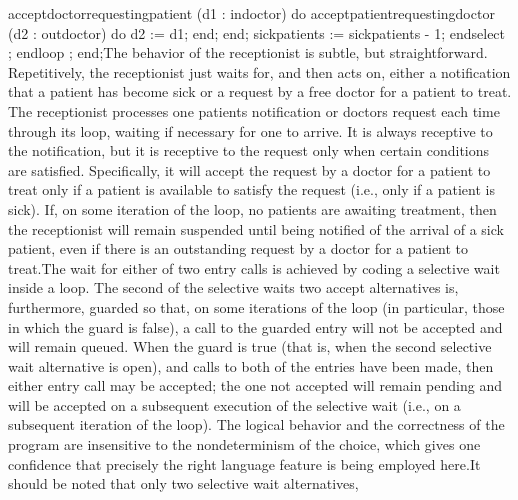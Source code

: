          \tyxtstxbf[]accept\tyxtstxendbf[] doctor\Symuns[]requesting\Symuns[]patient (d1 : %
\tyxtstxbf[]in\tyxtstxendbf[] doctor) \tyxtstxbf[]do%
\tyxtstxendbf[]
            \tyxtstxbf[]accept\tyxtstxendbf[] patient\Symuns[]requesting\Symuns[]doctor (d2 : %
\tyxtstxbf[]out\tyxtstxendbf[] doctor) \tyxtstxbf[]do%
\tyxtstxendbf[]
               d2 := d1;
            \tyxtstxbf[]end\tyxtstxendbf[];
         \tyxtstxbf[]end\tyxtstxendbf[];
         sick\Symuns[]patients := sick\Symuns[]patients - 1;
      \tyxtstxbf[]end\tyxtstxendbf[] \tyxtstxbf[]select%
\tyxtstxendbf[];
   \tyxtstxbf[]end\tyxtstxendbf[] \tyxtstxbf[]loop%
\tyxtstxendbf[];
\tyxtstxbf[]end\tyxtstxendbf[];\Endcomp[]
\EndParbox[]
\FgEndblock[]
 The behavior of the receptionist is subtle, but straightforward.
Repetitively, the receptionist just waits for, and then acts on, either
a notification that a patient has become sick or a request by a free
doctor for a patient to treat. The receptionist processes one patient\rsquo[]s
notification or doctor\rsquo[]s request each time through its loop,
waiting if necessary for one to arrive. It is always receptive to
the notification, but it is receptive to the request only when certain
conditions are satisfied. Specifically, it will accept the request
by a doctor for a patient to treat only if a patient is available
to satisfy the request (i.e., only if a patient is sick). If, on some
iteration of the loop, no patients are awaiting treatment, then the
receptionist will remain suspended until being notified of the arrival
of a sick patient, even if there is an outstanding request by a doctor
for a patient to treat.\Endpara[]
\Para[]The wait for either of two entry calls is achieved by coding
a selective wait inside a loop. The second of the selective wait\rsquo[]s
two accept alternatives is, furthermore, guarded so that, on some
iterations of the loop (in particular, those in which the guard is
false), a call to the guarded entry will not be accepted and will
remain queued. When the guard is true (that is, when the second selective
wait alternative is \ldquo[]open\rdquo[]), and calls to both of the
entries have been made, then either entry call may be accepted; the
one not accepted will remain pending and will be accepted on a subsequent
execution of the selective
\TyPbrkNewp[]
 wait (i.e., on a subsequent iteration of the loop). The logical behavior
and the correctness of the program are insensitive to the nondeterminism
of the choice, which gives one confidence that precisely the right
language feature is being employed here.\Endpara[]
\Para[]It should be noted that only two selective wait alternatives,
